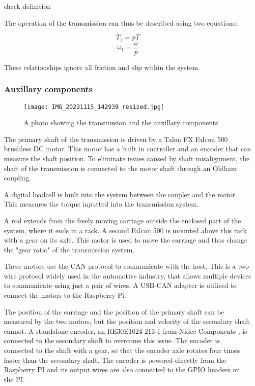 \documentclass[12pt]{article}
\begin{document}
\todo check definition

The operation of the transmission can thus be described using two equations:

$$T_1=pT$$
$$\omega_1=\frac{\omega}{p}$$

These relationships ignore all friction and slip within the system.

\subsubsection{Auxillary components}
\begin{figure}
    \centering
    \texttt{[image: IMG\_20231115\_142939 resized.jpg]}
    \caption{A photo showing the transmission and the auxillary components}
    \label{fig:photo}
\end{figure}

The primary shaft of the transmission is driven by a Talon FX Falcon 500 brushless DC motor. This motor has a built in controller and an encoder that can measure the shaft position. To eliminate issues caused by shaft misalignment, the shaft of the transmission is connected to the motor shaft through an Oldham coupling. 

A digital loadcell is built into the system between the coupler and the motor. This measures the torque inputted into the transmission system.

A rod extends from the freely moving carriage outside the enclosed part of the system, where it ends in a rack. A second Falcon 500 is mounted above this rack with a gear on its axle. This motor is used to move the carriage and thus change the "gear ratio" of the transmission system. 

These motors use the CAN protocol to communicate with the host. This is a two wire protocol widely used in the automotive industry, that allows multiple devices to communicate using just a pair of wires. A \todo  USB-CAN adapter is utilised to connect the motors to the Raspberry Pi.

The position of the carriage and the position of the primary shaft can be measured by the two motors, but the position and velocity of the secondary shaft cannot. A standalone encoder, an RE30E1024-213-1 from Nidec Components \cite{encoder}, is connected to the secondary shaft to overcome this issue. The encoder is connected to the shaft with a gear, so that the encoder axle rotates four times faster than the secondary shaft. The encoder is powered directly from the Raspberry PI and its output wires are also connected to the GPIO headers on the PI.
\end{document}
